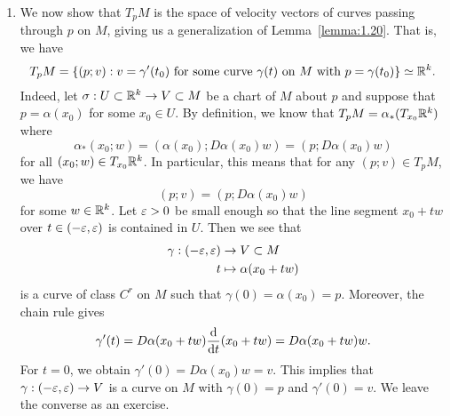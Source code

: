 \begin{enumerate}[(1)]
    \item We now show that $T_pM$ is the space of velocity vectors of 
    curves passing through $p$ on $M$, giving us a generalization of 
    Lemma~\ref{lemma:1.20}. That is, we have 
    \[ T_pM = \{(p; v) : \text{$v = \gamma'(t_0)$ for some curve $\gamma(t)$ 
    on $M$ with $p = \gamma(t_0)$}\} \simeq \mathbb{R}^k. \] 
    Indeed, let $\sigma : U \subset \mathbb{R}^k \to V \subset M$ be a chart of $M$ 
    about $p$ and suppose that $p = \alpha(x_0)$ for some $x_0 \in U$. 
    By definition, we know that $T_pM = \alpha_*(T_{x_0}\mathbb{R}^k)$ where 
    \[ \alpha_*(x_0; w) = (\alpha(x_0); D\alpha(x_0)w) = 
    (p; D\alpha(x_0)w) \] 
    for all $(x_0; w) \in T_{x_0}\mathbb{R}^k$. In particular, this means that 
    for any $(p; v) \in T_pM$, we have 
    \[ (p; v) = (p; D\alpha(x_0)w) \] 
    for some $w \in \mathbb{R}^k$. Let $\varepsilon > 0$ be small enough so that the 
    line segment $x_0 + tw$ over $t \in (-\varepsilon, \varepsilon)$ is contained in $U$. 
    Then we see that 
    \begin{align*}
        \gamma : (-\varepsilon, \varepsilon) &\to V \subset M \\ 
        t &\mapsto \alpha(x_0 + tw) 
    \end{align*}
    is a curve of class $C^r$ on $M$ such that $\gamma(0) = \alpha(x_0) = p$. 
    Moreover, the chain rule gives 
    \[ \gamma'(t) = D\alpha(x_0 + tw) \frac{\rm d}{{\rm d}t}(x_0 + tw) = D\alpha(x_0 + tw) w. \] 
    For $t = 0$, we obtain $\gamma'(0) = D\alpha(x_0)w = v$. This implies 
    that $\gamma : (-\varepsilon, \varepsilon) \to V$ is a curve on $M$ with $\gamma(0) = p$ 
    and $\gamma'(0) = v$. We leave the converse as an exercise.
\end{enumerate}

